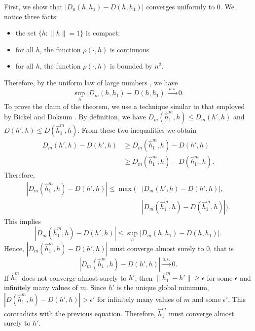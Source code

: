 \documentclass[10pt,journal,compsoc]{IEEEtran}
\newenvironment{proof}[1][Proof]{\begin{trivlist}
		\item[\hskip \labelsep {\bfseries #1}]}{\end{trivlist}}
\begin{document}
\begin{proof} [Proof of Theorem 4.1]
First,  we show that $|D_n(h,h_1)-D(h,h_1)|$ converges uniformly to $0$.
We notice three facts:
\begin{itemize}
	\item[(1)] the set $\{h: \|h\|=1\}$ is compact;
	\item[(2)] for all $h$, the function $\rho(\cdot,h)$ is continuous
	\item[(3)] for all $h$, the function $\rho(\cdot,h)$ is bounded by $n^2$.
\end{itemize}
Therefore, by the uniform law of large numbers \cite{jennrich1969asymptotic}, we have
\[\underset{h}{\sup}|D_m(h,h_1)-D(h,h_1)|\overset{a.s.}{\rightarrow} 0.\]
To prove the claim of the theorem, we use a technique similar to that employed by Bickel and Doksum \cite{bickel2015mathematical}. By definition, we have $D_m(\hat{h}_1^m,h)  \leq D_m(h',h)$ and $D(h',h) \leq D(\hat{h}_1^m,h)$. From these two inequalities we obtain
\begin{align*}
D_m(h',h)-D(h',h) &\geq D_m(\hat{h}_1^m,h)-D(h',h) \\
&\geq D_m(\hat{h}_1^m,h)-D(\hat{h}_1^m,h) .
\end{align*}
Therefore, 
\begin{align*}
|D_m(\hat{h}_1^m,h)-D(h',h)|  \leq  \max(&|D_m(h',h)-D(h',h)|,\\
& |D_m(\hat{h}_1^m,h)-D(\hat{h}_1^m,h)|).
\end{align*}
This implies 
\[ |D_m(\hat{h}_1^m,h)-D(h',h)| \leq \underset{h}{\sup}|D_m(h,h_1)-D(h,h_1)|. \]
Hence, $|D_m(\hat{h}_1^m,h)-D(h',h)|$ must converge almost surely to $0$, that is
\[|D_m(\hat{h}_1^m,h)-D(h',h)|\overset{a.s.}{\rightarrow} 0 .\]
 If $\hat{h}_1^m$ does not converge almost surely to $h'$, then  $\|\hat{h}_1^m-h'\|\geq \epsilon$ for some $\epsilon$ and infinitely many values of $m$. Since $h'$ is the unique global minimum, $|D(\hat{h}_1^m,h)-D(h',h)| > \epsilon' $ for infinitely many values of $m$ and some $\epsilon' $. This contradicts with the previous equation. Therefore, $\hat{h}_1^m$ must converge almost surely to $h'$.
\end{proof}
\end{document}
